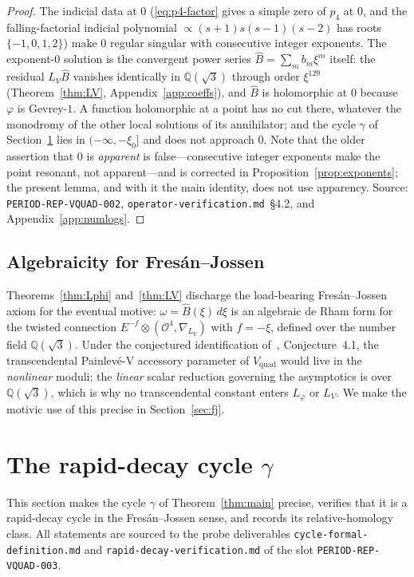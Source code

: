 \documentclass[11pt,reqno]{amsart}
\renewcommand{\_}{\vquadorigunderscore\allowbreak}
\theoremstyle{plain}
\theoremstyle{definition}
\newcommand{\Vquad}{V_{\mathrm{quad}}}
\newcommand{\Bhat}{\widehat{B}}
\newcommand{\Lphi}{L_{\varphi}}
\newcommand{\LV}{L_{V}}
\newcommand{\Qsqrt}{\mathbb{Q}(\sqrt3)}
\newcommand{\xizero}{\xi_0}
\begin{document}
\begin{proof}
The indicial data at $0$ (\eqref{eq:p4-factor} gives a simple zero of $p_4$ at $0$, and the
falling-factorial indicial polynomial $\propto(s+1)s(s-1)(s-2)$ has roots $\{-1,0,1,2\}$) make
$0$ regular singular with consecutive integer exponents. The exponent-$0$ solution is the
convergent power series $\Bhat=\sum_m b_m\xi^m$ itself: the residual $\LV\Bhat$ vanishes
identically in $\Qsqrt$ through order $\xi^{129}$ (Theorem~\ref{thm:LV},
Appendix~\ref{app:coeffs}), and $\Bhat$ is holomorphic at $0$ because $\varphi$ is Gevrey-$1$.
A function holomorphic at a point has no cut there, whatever the monodromy of the other local
solutions of its annihilator; and the cycle $\gamma$ of Section~\ref{sec:cycle} lies in
$(-\infty,-\xizero]$ and does not approach $0$. Note that the older assertion that $0$ is
\emph{apparent} is false---consecutive integer exponents make the point resonant, not
apparent---and is corrected in Proposition~\ref{prop:exponents}; the present lemma, and with it
the main identity, does not use apparency. Source: \texttt{PERIOD-REP-VQUAD-002},
\texttt{operator-verification.md}~\S4.2, and Appendix~\ref{app:numlogs}.
\end{proof}

\subsection{Algebraicity for Fres\'an--Jossen}
Theorems~\ref{thm:Lphi} and~\ref{thm:LV} discharge the load-bearing Fres\'an--Jossen axiom for
the eventual motive: $\omega=\Bhat(\xi)\,d\xi$ is an algebraic de Rham form for the twisted
connection $E^{-f}\otimes(\mathcal{O}^4,\nabla_{\LV})$ with $f=-\xi$, defined over the number
field $\Qsqrt$. Under the conjectured identification of~\cite{Vquad}, Conjecture~4.1, the
transcendental Painlev\'e-V accessory parameter of $\Vquad$ would live in the
\emph{nonlinear} moduli; the \emph{linear} scalar reduction governing the asymptotics is over
$\Qsqrt$, which is why no transcendental constant enters $\Lphi$ or $\LV$. We make the motivic
use of this precise in Section~\ref{sec:fj}.

\section{The rapid-decay cycle \texorpdfstring{$\gamma$}{gamma}}\label{sec:cycle}

This section makes the cycle $\gamma$ of Theorem~\ref{thm:main} precise, verifies that it is a
rapid-decay cycle in the Fres\'an--Jossen sense, and records its relative-homology class. All
statements are sourced to the probe deliverables
\texttt{cycle-formal-definition.md} and \texttt{rapid-decay-verification.md} of the slot
\texttt{PERIOD-REP-VQUAD-003}.
\end{document}
